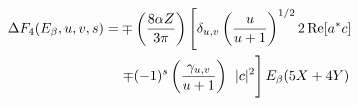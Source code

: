 %
%
%
\begin{align}
\Delta F_4(E_{\beta}, u, v, s) = &
\mp \left( \frac{8 \alpha Z}{3\pi } \right) \left[ \delta_{u,v} \left( \frac{u}{u+1} \right)^{1/2} 2\,\mathrm{Re}\! \,[a^* c] 
\right. \nonumber \\ & \left.
\mp (-1)^s \left( \frac{\gamma_{u,v}}{u+1} \right)^{\phantom{1/2}}\!\!\!\!\! |c|^2 \right] E_{\beta} (5X + 4Y)
\end{align}
% 
% 
% 
